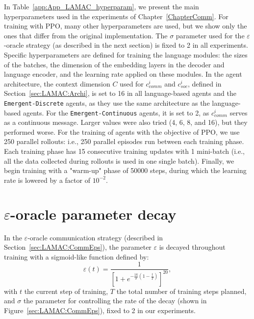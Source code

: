 In Table~\ref{app:App_LAMAC_hyperparam}, we present the main hyperparameters used in the experiments of Chapter~\ref{ChapterComm}. For training with PPO, many other hyperparameters are used, but we show only the ones that differ from the original implementation. The $\sigma$ parameter used for the $\varepsilon$-oracle strategy (as described in the next section) is fixed to 2 in all experiments. Specific hyperparameters are defined for training the language modules: the sizes of the batches, the dimension of the embedding layers in the decoder and language encoder, and the learning rate applied on these modules. In the agent architecture, the context dimension $C$ used for $c^i_{comm}$ and $c^i_{soc}$, defined in Section~\ref{sec:LAMAC:Archi}, is set to 16 in all language-based agents and the \texttt{Emergent-Discrete} agents, as they use the same architecture as the language-based agents. For the \texttt{Emergent-Continuous} agents, it is set to 2, as $c^i_{comm}$ serves as a continuous message. Larger values were also tried (4, 6, 8, and 16), but they performed worse. For the training of agents with the objective of PPO, we use 250 parallel rollouts: i.e., 250 parallel episodes run between each training phase. Each training phase has 15 consecutive training updates with 1 mini-batch (i.e., all the data collected during rollouts is used in one single batch). Finally, we begin training with a "warm-up" phase of 50000 steps, during which the learning rate is lowered by a factor of $10^{-2}$. 





\section{$\varepsilon$-oracle parameter decay}\label{app:LAMAC:param_decay}

In the $\varepsilon$-oracle communication strategy (described in Section~\ref{sec:LAMAC:CommEps}), the parameter $\varepsilon$ is decayed throughout training with a sigmoid-like function defined by:
\begin{equation}
    \varepsilon(t)=\frac{1}{\left[ 1 + e^{-\frac{16}{\sigma}\left( 1 - \frac{t}{T} \right)} \right]^{20}},
\end{equation}
with $t$ the current step of training, $T$ the total number of training steps planned, and $\sigma$ the parameter for controlling the rate of the decay (shown in Figure~\ref{sec:LAMAC:CommEps}), fixed to 2 in our experiments. 
